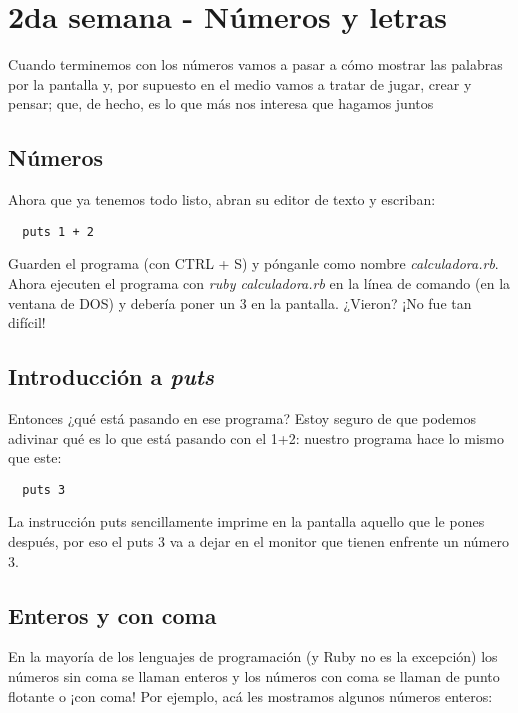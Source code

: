 \chapter{2da semana - Números y letras}

Cuando terminemos con los números vamos a pasar a cómo mostrar las palabras por la pantalla y, por supuesto en el medio vamos a tratar de jugar, crear y pensar; que, de hecho, es lo que más nos interesa que hagamos juntos

\section{Números}
Ahora que ya tenemos todo listo, abran su editor de texto y escriban:

\begin{lstlisting}
  puts 1 + 2
\end{lstlisting}

Guarden el programa (con CTRL + S) y pónganle como nombre \emph{calculadora.rb}. Ahora ejecuten el programa con \emph{ruby calculadora.rb} en la línea de comando (en la ventana de DOS) y debería poner un 3 en la pantalla. ¿Vieron? ¡No fue tan difícil!

\section{Introducción a \emph{puts}}
Entonces ¿qué está pasando en ese programa? Estoy seguro de que podemos adivinar qué es lo que está pasando con el 1+2: nuestro programa hace lo mismo que este:

\begin{lstlisting}
  puts 3
\end{lstlisting}

La instrucción puts sencillamente imprime en la pantalla aquello que le pones después, por eso el puts 3 va a dejar en el monitor que tienen enfrente un número 3.

\section{Enteros y con coma}
En la mayoría de los lenguajes de programación (y Ruby no es la excepción) los números sin coma se llaman enteros y los números con coma se llaman de punto flotante o ¡con coma! Por ejemplo, acá les mostramos algunos números enteros: 

